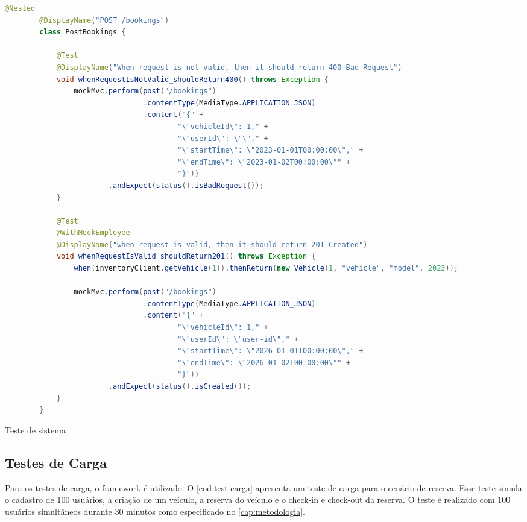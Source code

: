 \begin{codigo}[H]
    \begin{lstlisting}[language=Java]
        @Nested
        @DisplayName("POST /bookings")
        class PostBookings {

            @Test
            @DisplayName("When request is not valid, then it should return 400 Bad Request")
            void whenRequestIsNotValid_shouldReturn400() throws Exception {
                mockMvc.perform(post("/bookings")
                                .contentType(MediaType.APPLICATION_JSON)
                                .content("{" +
                                        "\"vehicleId\": 1," +
                                        "\"userId\": \"\"," +
                                        "\"startTime\": \"2023-01-01T00:00:00\"," +
                                        "\"endTime\": \"2023-01-02T00:00:00\"" +
                                        "}"))
                        .andExpect(status().isBadRequest());
            }

            @Test
            @WithMockEmployee
            @DisplayName("when request is valid, then it should return 201 Created")
            void whenRequestIsValid_shouldReturn201() throws Exception {
                when(inventoryClient.getVehicle(1)).thenReturn(new Vehicle(1, "vehicle", "model", 2023));

                mockMvc.perform(post("/bookings")
                                .contentType(MediaType.APPLICATION_JSON)
                                .content("{" +
                                        "\"vehicleId\": 1," +
                                        "\"userId\": \"user-id\"," +
                                        "\"startTime\": \"2026-01-01T00:00:00\"," +
                                        "\"endTime\": \"2026-01-02T00:00:00\"" +
                                        "}"))
                        .andExpect(status().isCreated());
            }
        }
    \end{lstlisting}
    \caption{Teste de sistema}
    \label{cod:test-sistema}
\end{codigo}

\subsection{Testes de Carga}
Para os testes de carga, o framework  é utilizado. O \autoref{cod:test-carga} apresenta um teste de carga para o cenário de reserva. Esse teste simula o cadastro de 100 usuários, a criação de um veículo, a reserva do veículo e o check-in e check-out da reserva. O teste é realizado com 100 usuários simultâneos durante 30 minutos como especificado no \autoref{cap:metodologia}.


